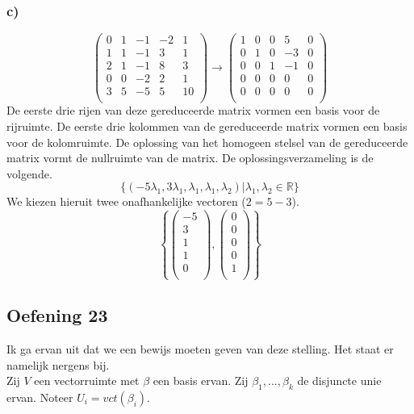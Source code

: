 \documentclass[lineaire_algebra_oplossingen.tex]{subfiles}
\begin{document}
\subsubsection*{c)}
\[
\begin{pmatrix}
0 & 1 & -1 &  -2 & 1 \\
1 & 1 & -1 & 3   & 1 \\
2 & 1 & -1 & 8   & 3 \\
0 & 0 & -2 & 2   & 1 \\
3 & 5 & -5 & 5   & 10\\
\end{pmatrix}
\longrightarrow
\begin{pmatrix}
1 & 0 & 0 & 5 & 0 \\
0 & 1 & 0 & -3& 0 \\
0 & 0 & 1 & -1& 0 \\
0 & 0 & 0 & 0 & 0 \\
0 & 0 & 0 & 0 & 0 \\
\end{pmatrix}
\]
De eerste drie rijen van deze gereduceerde matrix vormen een basis voor de rijruimte.
De eerste drie kolommen van de gereduceerde matrix vormen een basis voor de kolomruimte. 
De oplossing van het homogeen stelsel van de gereduceerde matrix vormt de nullruimte van de matrix.
De oplossingsverzameling is de volgende.
\[
\{(-5\lambda_1,3\lambda_1,\lambda_1,\lambda_1,\lambda_2)|\lambda_1,\lambda_2\in \mathbb{R}\}
\]
We kiezen hieruit twee onafhankelijke vectoren ($2=5-3$).
\[
\left\lbrace
\begin{pmatrix}
-5\\3\\1\\1\\0\\
\end{pmatrix}
,
\begin{pmatrix}
0\\0\\0\\0\\1\\
\end{pmatrix}
\right\rbrace
\]

\subsection{Oefening 23}
Ik ga ervan uit dat we een bewijs moeten geven van deze stelling. Het staat er namelijk nergens bij.\\
Zij $V$ een vectorruimte met $\beta$ een basis ervan. Zij $\beta_1,...,\beta_k$ de disjuncte unie ervan. Noteer $U_i=vct(\beta_i)$.
\end{document}
